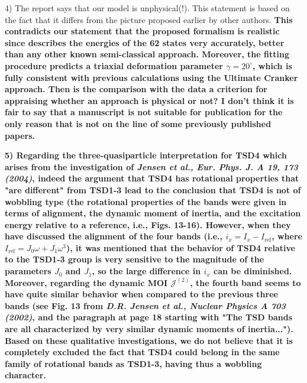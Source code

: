 \documentclass[11pt,a4paper]{article}
\begin{document}
4) The report says that our model is unphysical(!). This statement is based on the fact that it differs from the picture proposed earlier by other authors. \textbf{This contradicts our statement that the proposed formalism is realistic since describes the energies of the 62 states very accurately, better than any other known semi-classical approach. Moreover, the fitting procedure predicts a triaxial deformation parameter $\gamma=20^\circ$, which is fully consistent with previous calculations using the Ultimate Cranker approach. Then is the comparison with the data a criterion for appraising whether an approach is physical or not? I don’t think it is fair to say that a manuscript is not suitable for publication for the only reason that is not on the line of some previously published papers.}

\textbf{
5) Regarding the three-quasiparticle interpretation for TSD4 which arises from the investigation of \emph{Jensen et al., Eur. Phys. J. A 19, 173 (2004)}, indeed the argument that TSD4 has rotational properties that "are different" from TSD1-3 lead to the conclusion that TSD4 is not of wobbling type (the rotational properties of the bands were given in terms of alignment, the dynamic moment of inertia, and the excitation energy relative to a reference, i.e., Figs. 13-16). However, when they have discussed the alignment of the four bands (i.e., $i_x=I_x-I_\text{ref}$, where $I_\text{ref}=J_0\omega+J_1\omega^3$), it was mentioned that the behavior of TSD4 relative to the TSD1-3 group is very sensitive to the magnitude of the parameters $J_0$ and $J_1$, so the large difference in $i_x$ can be diminished. Moreover, regarding the dynamic MOI $\mathcal{J}^{(2)}$, the fourth band seems to have quite similar behavior when compared to the previous three bands (see Fig. 13 from \emph{D.R. Jensen et al., Nuclear Physics A 703 (2002)}, and the paragraph at page 18 starting with "The TSD bands are all characterized by very similar dynamic moments of inertia..."). Based on these qualitative investigations, we do not believe that it is completely excluded the fact that TSD4 could belong in the same family of rotational bands as TSD1-3, having thus a wobbling character.}
\end{document}
